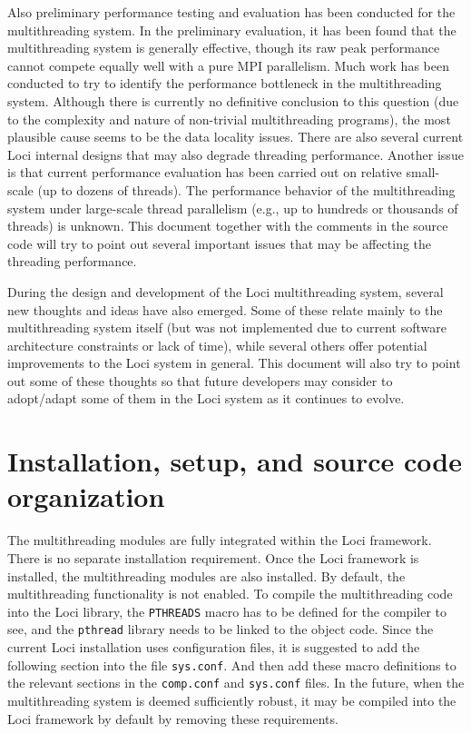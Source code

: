 \documentclass{article}
\begin{document}
Also preliminary performance testing and evaluation has been conducted
for the multithreading system.  In the preliminary evaluation, it has
been found that the multithreading system is generally effective, though
its raw peak performance cannot compete equally well with a pure MPI
parallelism.  Much work has been conducted to try to identify the
performance bottleneck in the multithreading system.  Although there is
currently no definitive conclusion to this question (due to the
complexity and nature of non-trivial multithreading programs), the most
plausible cause seems to be the data locality issues.  There are also
several current Loci internal designs that may also degrade threading
performance.  Another issue is that current performance evaluation has
been carried out on relative small-scale (up to dozens of threads).  The
performance behavior of the multithreading system under large-scale
thread parallelism (e.g., up to hundreds or thousands of threads) is
unknown.  This document together with the comments in the source code
will try to point out several important issues that may be affecting the
threading performance.

During the design and development of the Loci multithreading system,
several new thoughts and ideas have also emerged.  Some of these relate
mainly to the multithreading system itself (but was not implemented due
to current software architecture constraints or lack of time), while
several others offer potential improvements to the Loci system in
general.  This document will also try to point out some of these
thoughts so that future developers may consider to adopt/adapt some of
them in the Loci system as it continues to evolve.

\section{Installation, setup, and source code organization}
The multithreading modules are fully integrated within the Loci
framework.  There is no separate installation requirement.  Once the
Loci framework is installed, the multithreading modules are also
installed.  By default, the multithreading functionality is not enabled.
To compile the multithreading code into the Loci library, the
\texttt{PTHREADS} macro has to be defined for the compiler to see, and
the \texttt{pthread} library needs to be linked to the object code.
Since the current Loci installation uses configuration files, it is
suggested to add the following section into the file \texttt{sys.conf}.
And then add these macro definitions to the relevant sections in the
\texttt{comp.conf} and \texttt{sys.conf} files.  In the future, when the
multithreading system is deemed sufficiently robust, it may be compiled
into the Loci framework by default by removing these requirements.
\end{document}
